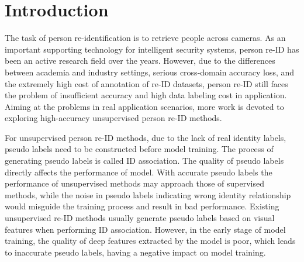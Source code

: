 \documentclass[10pt,twocolumn,letterpaper]{article}
\begin{document}
\section{Introduction}

The task of person re-identification is to retrieve people across cameras. As an important supporting technology for intelligent security systems, person re-ID has been an active research field over the years. However, due to the differences between academia and industry settings, serious cross-domain accuracy loss, and the extremely high cost of annotation of re-ID datasets, person re-ID still faces the problem of insufficient accuracy and high data labeling cost in application. Aiming at the problems in real application scenarios, more work is devoted to exploring high-accuracy unsupervised person re-ID methods.

For unsupervised person re-ID methods, due to the lack of real identity labels, pseudo labels need to be constructed before model training. The process of generating pseudo labels is called ID association. The quality of pseudo labels directly affects the performance of model. With accurate pseudo labels the performance of unsupervised methods may approach those of supervised methods, while the noise in pseudo labels indicating wrong identity relationship would misguide the training process and result in bad performance. Existing unsupervised re-ID methods usually generate pseudo labels based on visual features when performing ID association. However, in the early stage of model training, the quality of deep features extracted by the model is poor, which leads to inaccurate pseudo labels, having a negative impact on model training. 
\end{document}
